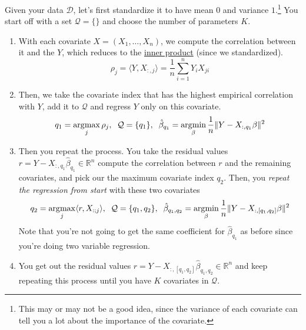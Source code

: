   \begin{definition}
    \label{def:greedy-forward-stepwise-regression}
    Given your data $\mathcal{D}$, let's first standardize it to have mean $0$ and variance $1$.\footnote{This may or may not be a good idea, since the variance of each covariate can tell you a lot about the importance of the covariate.} You start off with a set $\mathcal{Q} = \{\}$ and choose the number of parameters $K$. 
    \begin{enumerate}
      \item With each covariate $X = (X_1, \ldots, X_n)$, we compute the correlation between it and the $Y$, which reduces to the \hyperref[lin-def:inner-product]{inner product} (since we standardized). 
      \begin{equation}
        \rho_j = \langle Y, X_{:, j} \rangle = \frac{1}{n} \sum_{i=1}^n Y_i X_{ji}
      \end{equation}

      \item Then, we take the covariate index that has the highest empirical correlation with $Y$, add it to $\mathcal{Q}$ and regress $Y$ only on this covariate. 
      \begin{equation}
        q_1 = \operatorname*{\arg\!\max}_j \rho_j , \;\; \mathcal{Q} = \{q_1\}, \;\; \hat{\beta}_{q_1} = \operatorname*{\arg\!\min}_{\beta} \frac{1}{n} \|Y - X_{:, q_1} \beta\|^2 
      \end{equation}

      \item Then you repeat the process. You take the residual values $r = Y - X_{:, q_1} \hat{\beta}_{q_1} \in \mathbb{R}^n$ compute the correlation between $r$ and the remaining covariates, and pick our the maximum covariate index $q_2$. Then, you \textit{repeat the regression from start} with these two covariates 
      \begin{equation}
        q_2 = \operatorname*{\arg\!\max}_j \langle r, X_{: ; j} \rangle , \;\; \mathcal{Q} = \{q_1, q_2\}, \;\; \hat{\beta}_{q_1, q_2} = \operatorname*{\arg\!\min}_{\beta} \frac{1}{n} \|Y - X_{:,[q_1, q_2]} \beta\|^2
      \end{equation}
      Note that you're not going to get the same coefficient for $\hat{\beta}_{q_1}$ as before since you're doing two variable regression. 

      \item You get out the residual values $r = Y - X_{:, [q_1, q_2]} \hat{\beta}_{q_1, q_2} \in \mathbb{R}^n$ and keep repeating this process until you have $K$ covariates in $\mathcal{Q}$. 
    \end{enumerate}
  \end{definition}

